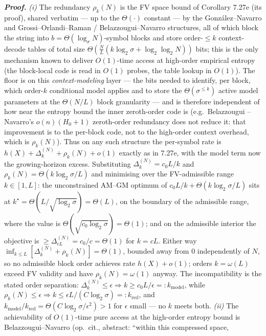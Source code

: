\documentclass[
]{article}
\begin{document}
\emph{\textbf{Proof.}} \emph{(i)} The redundancy $\rho_k(N)$ is the FV
space bound of Corollary 7.27e (its proof), shared verbatim --- up to the
$\Theta(\cdot)$ constant --- by the Gonz\'alez--Navarro and
Grossi--Orlandi--Raman / Belazzougui--Navarro structures, all of which
block the string into $b = \Theta(\log_\sigma N)$-symbol blocks and store
order-$\leq k$ context-decode tables of total size $\Theta(\tfrac{N}{L}
(k\log_2\sigma + \log_2\log_2 N))$ bits; this is the only mechanism known
to deliver $O(1)$-time access at high-order empirical entropy (the
block-local code is read in $O(1)$ probes, the table lookup in $O(1)$).
The floor is on this \emph{context-modeling} layer --- the bits needed to
identify, per block, which order-$k$ conditional model applies and to
store the $\Theta(\sigma^{\leq k})$ active model parameters at the
$\Theta(N/L)$ block granularity --- and is therefore independent of how
near the entropy bound the inner zeroth-order code is (e.g.\ Belazzougui
--Navarro's $o(n)(H_0+1)$ zeroth-order redundancy does not reduce it: that
improvement is to the per-block code, not to the high-order context
overhead, which is $\rho_k(N)$).
Thus on any such structure the per-symbol rate is $h(X) + \Delta_k^{(N)} +
\rho_k(N) + o(1)$ exactly as in 7.27e, with the model term now the
growing-horizon excess. Substituting $\Delta_k^{(N)} = c_0 L/k$ and
$\rho_k(N) = \Theta(k\log_2\sigma/L)$ and minimising over the FV-admissible
range $k \in [1, L]$: the unconstrained AM--GM optimum of $c_0 L/k +
\Theta(k\log_2\sigma/L)$ sits at $k^\star = \Theta(L/\sqrt{\log_2\sigma})
= \Theta(L)$, on the boundary of the admissible range, where the value is
$\Theta(\sqrt{c_0\log_2\sigma}) = \Theta(1)$; and on the admissible
interior the objective is $\geq \Delta_{cL}^{(N)} = c_0/c = \Theta(1)$ for
$k = cL$. Either way $\inf_{k \leq L}[\Delta_k^{(N)} + \rho_k(N)] =
\Theta(1)$, bounded away from $0$ independently of $N$, so no admissible
block order achieves rate $h(X) + o(1)$; orders $k = \omega(L)$ exceed FV
validity and have $\rho_k(N) = \omega(1)$ anyway. The incompatibility is
the stated order separation: $\Delta_k^{(N)} \leq \epsilon \Rightarrow k
\geq c_0 L/\epsilon =: k_{\mathrm{model}}$, while $\rho_k(N) \leq \epsilon
\Rightarrow k \leq \epsilon L/(C\log_2\sigma) =: k_{\mathrm{red}}$, and
$k_{\mathrm{model}}/k_{\mathrm{red}} = \Theta(C\log_2\sigma/\epsilon^2) >
1$ for $\epsilon$ small --- no $k$ meets both. \emph{(ii)} The achievability
of $O(1)$-time pure access at the high-order entropy bound is
Belazzougui--Navarro (op.\ cit., abstract: ``within this compressed space,
\end{document}
